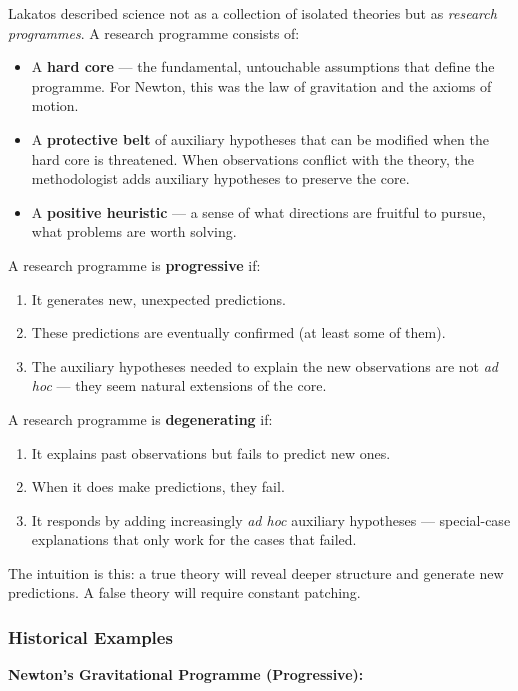 \documentclass[11pt,letterpaper]{article}
\begin{document}
Lakatos described science not as a collection of isolated theories but as \emph{research programmes}. A research programme consists of:

\begin{itemize}
  \item A \textbf{hard core} — the fundamental, untouchable assumptions that define the programme. For Newton, this was the law of gravitation and the axioms of motion.
  \item A \textbf{protective belt} of auxiliary hypotheses that can be modified when the hard core is threatened. When observations conflict with the theory, the methodologist adds auxiliary hypotheses to preserve the core.
  \item A \textbf{positive heuristic} — a sense of what directions are fruitful to pursue, what problems are worth solving.
\end{itemize}

A research programme is \textbf{progressive} if:
\begin{enumerate}
  \item It generates new, unexpected predictions.
  \item These predictions are eventually confirmed (at least some of them).
  \item The auxiliary hypotheses needed to explain the new observations are not \emph{ad hoc} — they seem natural extensions of the core.
\end{enumerate}

A research programme is \textbf{degenerating} if:
\begin{enumerate}
  \item It explains past observations but fails to predict new ones.
  \item When it does make predictions, they fail.
  \item It responds by adding increasingly \emph{ad hoc} auxiliary hypotheses — special-case explanations that only work for the cases that failed.
\end{enumerate}

The intuition is this: a true theory will reveal deeper structure and generate new predictions. A false theory will require constant patching.

\subsubsection*{Historical Examples}

\textbf{Newton's Gravitational Programme (Progressive):}
\end{document}
